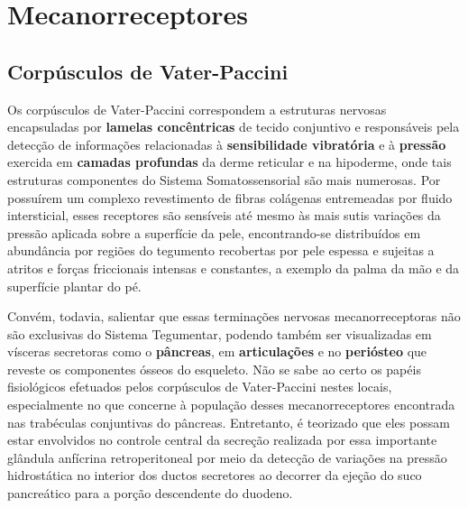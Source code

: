 \documentclass[
]{book}
\theoremstyle{definition}
\theoremstyle{definition}
\theoremstyle{definition}
\theoremstyle{definition}
\theoremstyle{remark}
\begin{document}
\hypertarget{mecanorreceptores}{%
\chapter{Mecanorreceptores}\label{mecanorreceptores}}

\hypertarget{corpuxfasculos-de-vater-paccini}{%
\section{Corpúsculos de Vater-Paccini}\label{corpuxfasculos-de-vater-paccini}}

Os corpúsculos de Vater-Paccini correspondem a estruturas nervosas encapsuladas por \textbf{lamelas concêntricas} de tecido conjuntivo e responsáveis pela detecção de informações relacionadas à \textbf{sensibilidade vibratória} e à \textbf{pressão} exercida em \textbf{camadas profundas} da derme reticular e na hipoderme, onde tais estruturas componentes do Sistema Somatossensorial são mais numerosas. Por possuírem um complexo revestimento de fibras colágenas entremeadas por fluido intersticial, esses receptores são sensíveis até mesmo às mais sutis variações da pressão aplicada sobre a superfície da pele, encontrando-se distribuídos em abundância por regiões do tegumento recobertas por pele espessa e sujeitas a atritos e forças friccionais intensas e constantes, a exemplo da palma da mão e da superfície plantar do pé.

Convém, todavia, salientar que essas terminações nervosas mecanorreceptoras não são exclusivas do Sistema Tegumentar, podendo também ser visualizadas em vísceras secretoras como o \textbf{pâncreas}, em \textbf{articulações} e no \textbf{periósteo} que reveste os componentes ósseos do esqueleto. Não se sabe ao certo os papéis fisiológicos efetuados pelos corpúsculos de Vater-Paccini nestes locais, especialmente no que concerne à população desses mecanorreceptores encontrada nas trabéculas conjuntivas do pâncreas. Entretanto, é teorizado que eles possam estar envolvidos no controle central da secreção realizada por essa importante glândula anfícrina retroperitoneal por meio da detecção de variações na pressão hidrostática no interior dos ductos secretores ao decorrer da ejeção do suco pancreático para a porção descendente do duodeno.
\end{document}
